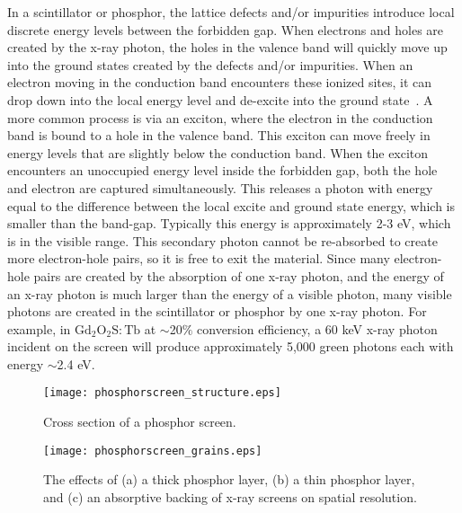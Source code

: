 In a scintillator or phosphor, the lattice defects and/or impurities introduce local discrete energy levels between the forbidden gap.  When electrons and holes are created by the x-ray photon, the holes in the valence band will quickly move up into the ground states created by the defects and/or impurities.  When an electron moving in the conduction band encounters these ionized sites, it can drop down into the local energy level and de-excite into the ground state~\citep{Knoll2010}.  A more common process is via an exciton, where the electron in the conduction band is bound to a hole in the valence band.  This exciton can move freely in energy levels that are slightly below the conduction band.  When the exciton encounters an unoccupied energy level inside the forbidden gap, both the hole and electron are captured simultaneously.  This releases a photon with energy equal to the difference between the local excite and ground state energy, which is smaller than the band-gap.  Typically this energy is approximately 2-3 eV, which is in the visible range.  This secondary photon cannot be re-absorbed to create more electron-hole pairs, so it is free to exit the material.  Since many electron-hole pairs are created by the absorption of one x-ray photon, and the energy of an x-ray photon is much larger than the energy of a visible photon, many visible photons are created in the scintillator or phosphor by one x-ray photon.  For example, in $\mathrm{Gd_2O_2S:Tb}$ at $\sim$20$\%$ conversion efficiency, a 60 keV x-ray photon incident on the screen will produce approximately 5,000 green photons each with energy $\sim$2.4 eV.

\begin{figure}[ht]
	\begin{minipage}{\linewidth}
		\centering
		\texttt{[image: phosphorscreen\_structure.eps]}
	\end{minipage}
\caption[Cross section of a phosphor screen.]{Cross section of a phosphor screen\footnotemark.}
\label{fig:phosphor_cross_section}
\end{figure}

\begin{figure}[ht]
\texttt{[image: phosphorscreen\_grains.eps]}
\caption{The effects of (a) a thick phosphor layer, (b) a thin phosphor layer, and (c) an absorptive backing of x-ray screens on spatial resolution.}
\label{fig:phosphor_effects}
\end{figure}

